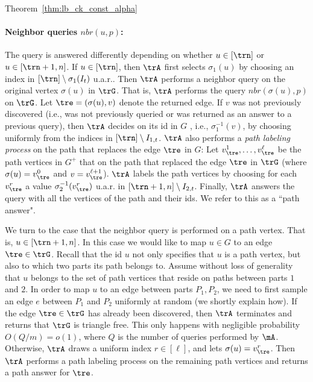\begin{proofof}{Theorem~\ref{thm:lb_ck_const_alpha}}

\paragraph{Neighbor queries $nbr(u,p)$:} 
The query is answered differently depending on whether $u\in [\trn]$ or $u\in [\trn+1,n]$.
If $u\in [\trn]$, then $\trA$ first selects $\sigma_1(u)$ by choosing an index in $[\trn]\setminus \sigma_1(I_t)$ u.a.r.. Then $\trA$ performs a neighbor query on the original vertex $\sigma(u)$ in $\trG$. That is, $\trA$ performs the query $nbr(\sigma(u), p)$ on $\trG$. 
    Let $\tre=(\sigma(u),v)$ denote the returned edge. 
    If $v$ was not previously discovered (i.e., was not previously queried or was returned as an answer to a previous query), then  
    $\trA$ decides on its id in $G$ , i.e., $\sigma^{-1}_1(v)$, by choosing uniformly from the indices in $[\trn]\setminus I_{1,t}$. 
    $\trA$ also performs a \emph{path labeling  process} on the path that replaces the edge $\tre$ in $G$:
    Let $v_{\tre}^1, \ldots, v_{\tre}^{\ell}$ be the path vertices in $G^+$ that 
    on the path that replaced the edge $\tre$ in $\trG$ (where $\sigma(u)=v_{\tre}^0$ and $v=v_{\tre}^{\ell+1}$).
    $\trA$  labels the path vertices  by choosing for each $v_{\tre}^r$ a value $\sigma_2^{-1}(v_{\tre}^r)$ u.a.r. in $[\trn+1, n]\setminus I_{2,t}$.
    Finally, $\trA$ answers the query with all the vertices of the path and their ids. %
    We refer to this as a ``path answer".

    We turn to the case that the neighbor query is performed on a path vertex. That is, $u\in [\trn+1, n]$.  
    In this case we would like to map $u\in G$ to an edge $\tre\in \trG$.  
    Recall that the id $u$ not only specifies that $u$ is a path vertex, but also to which two parts its path belongs to. Assume without loss of generality that $u$ belongs to the set of path vertices that reside on paths between parts $1$ and $2$. In order to map $u$ to an edge between parts $P_1,P_2$, we need to first sample an edge $e$ between $P_1$ and $P_2$ uniformly at random  (we shortly explain how).  If the edge $\tre\in \trG$ has already been  discovered, then $\trA$ terminates and returns that $\trG$ is triangle free. This only happens with negligible probability $O(Q/m)=o(1)$, where $Q$ is the number of queries performed by $\mA$. Otherwise, $\trA$  draws   a uniform index $r\in [\ell]$,  
  and lets $\sigma(u)=v_{\tre}^{r}$. Then 
    $\trA$ performs a path labeling process on the remaining path vertices and returns a path answer for $\tre$.
    

\end{proofof}
